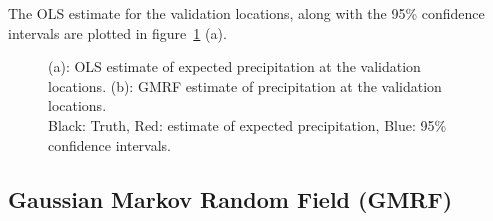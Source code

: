\documentclass[a4paper,10pt]{article}
\begin{document}
The OLS estimate for the validation locations, along with the 95\% confidence intervals are plotted in figure~\ref{fig:valid} (a).
\begin{figure}[ht]
\centering
  \qquad
  \caption{(a): OLS estimate of expected precipitation at the validation locations. (b): GMRF estimate of precipitation at the validation locations.\\ Black: Truth, Red: estimate of expected precipitation, Blue: 95\% confidence intervals.}
\label{fig:valid}
\end{figure}

\subsection{Gaussian Markov Random Field (GMRF)}
\end{document}

